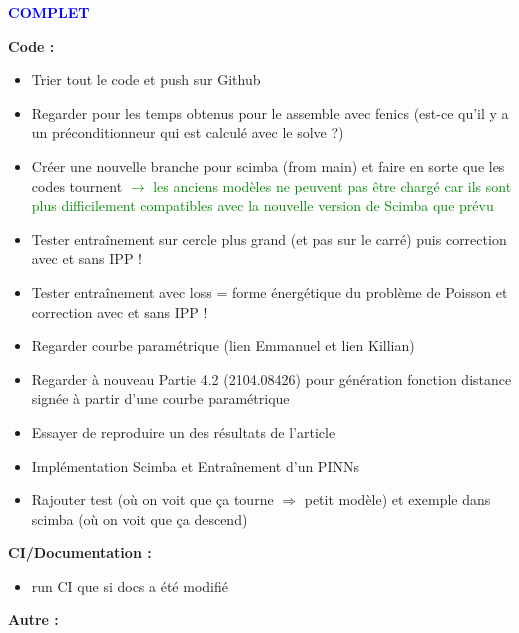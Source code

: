 \textcolor{blue}{\textbf{\large{COMPLET}}}

\textbf{Code :}
\begin{itemize}[label=$\square$] 
	\item[\done] Trier tout le code et push sur Github
	\item[\later] Regarder pour les temps obtenus pour le assemble avec fenics (est-ce qu'il y a un préconditionneur qui est calculé avec le solve ?)
	\item[\done] Créer une nouvelle branche pour scimba (from main) et faire en sorte que les codes tournent  \textcolor{green}{$\rightarrow$ les anciens modèles ne peuvent pas être chargé car ils sont plus difficilement compatibles avec la nouvelle version de Scimba que prévu}
	\item[\later] Tester entraînement sur cercle plus grand (et pas sur le carré) puis correction avec et sans IPP !
	\item[\later] Tester entraînement avec loss = forme énergétique du problème de Poisson et correction avec et sans IPP !
	\item[\done] Regarder courbe paramétrique (lien Emmanuel et lien Killian)
	\item[\done] Regarder à nouveau Partie 4.2 (2104.08426) pour génération fonction distance signée à partir d'une courbe paramétrique
	\item[\done] Essayer de reproduire un des résultats de l'article
	\item[\wontfix] Implémentation Scimba et Entraînement d'un PINNs
	\item[\later] Rajouter test (où on voit que ça tourne $\Rightarrow$ petit modèle) et exemple dans scimba (où on voit que ça descend)
\end{itemize}
\textbf{CI/Documentation :}
\begin{itemize}[label=$\square$] 
	\item[\done] run CI que si docs a été modifié
\end{itemize}
\textbf{Autre :}
